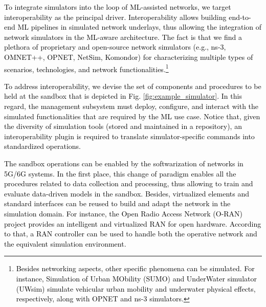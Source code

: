 \documentclass[journal]{IEEEtran}
\begin{document}
	\textcolor{black}{To integrate simulators into the loop of ML-assisted networks, we target interoperability as the principal driver. Interoperability allows building end-to-end ML pipelines in simulated network underlays, thus allowing the integration of network simulators in the ML-aware architecture. The fact is that we find a plethora of proprietary and open-source network simulators (e.g., ns-3, OMNET++, OPNET, NetSim, Komondor) for characterizing multiple types of scenarios, technologies, and network functionalities.\footnote{\textcolor{black}{Besides networking aspects, other specific phenomena can be simulated. For instance, Simulation of Urban MObility (SUMO) and UnderWater simulator (UWsim) simulate vehicular urban mobility and underwater physical effects, respectively, along with OPNET and ns-3 simulators.}}}
		
	\textcolor{black}{To address interoperability, we devise the set of components and procedures to be held at the sandbox that is depicted in Fig. \ref{fig:example_simulator}. In this regard, the management subsystem must deploy, configure, and interact with the simulated functionalities that are required by the ML use case. Notice that, given the diversity of simulation tools (stored and maintained in a repository), an interoperability plugin is required to translate simulator-specific commands into standardized operations.} 
			
	\textcolor{black}{The sandbox operations can be enabled by the softwarization of networks in 5G/6G systems. In the first place, this change of paradigm enables all the procedures related to data collection and processing, thus allowing to train and evaluate data-driven models in the sandbox. Besides, virtualized elements and standard interfaces can be reused to build and adapt the network in the simulation domain. For instance, the Open Radio Access Network (O-RAN) project provides an intelligent and virtualized RAN for open hardware. According to that, a RAN controller can be used to handle both the operative network and the equivalent simulation environment.} 
	
\end{document}
